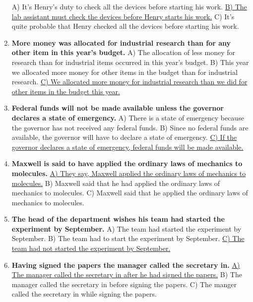 \documentclass[main.tex]{subfiles}
\begin{document}
\begin{enumerate}[nosep, leftmargin=*]
		A) It's Henry's duty to check all the devices before starting his work.\newline
		\uline{B) The lab assistant must check the devices before Henry starts his work.}\newline
		C) It's quite probable that Henry checked all the devices before starting his work.
	\item \textbf{More money was allocated for industrial research than for any other item in this year's budget.}\newline
		A) The allocation of less money for research than for industrial items occurred in this year's budget.\newline
		B) This year we allocated more money for other items in the budget than for industrial research.\newline
		\uline{C) We allocated more money for industrial research than we did for other items in the budget this year.}
	\item \textbf{Federal funds will not be made available unless the governor declares a state of emergency.}\newline
		A) There is a state of emergency because the governor has not received any federal funds.\newline
		B) Since no federal funds are available, the governor will have to declare a state of emergency.\newline
		\uline{C) If the governor declares a state of emergency, federal funds will be made available.}
	\item \textbf{Maxwell is said to have applied the ordinary laws of mechanics to molecules.}\newline
		\uline{A) They say, Maxwell applied the ordinary laws of mechanics to molecules.}\newline
		B) Maxwell said that he had applied the ordinary laws of mechanics to molecules.\newline
		C) Maxwell said that he applied the ordinary laws of mechanics to molecules.
	\item \textbf{The head of the department wishes his team had started the experiment by September.}\newline
		A) The team had started the experiment by September.\newline
		B) The team had to start the experiment by September.\newline
		\uline{C) The team had not started the experiment by September.}
	\item \textbf{Having signed the papers the manager called the secretary in.}\newline
		\uline{A) The manager called the secretary in after he had signed the papers.}\newline
		B) The manager called the secretary in before signing the papers.\newline
		C) The manger called the secretary in while signing the papers.
\end{enumerate}
\end{document}
